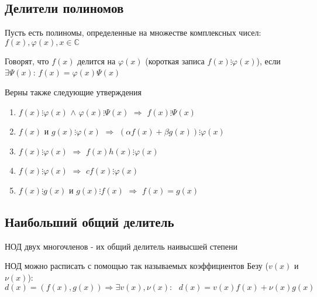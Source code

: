 \documentclass[class=article,a4paper,12pt,crop=false]{standalone}
\begin{document}
\subsection{Делители полиномов}

Пусть есть полиномы, определенные на множестве комплексных чисел: $f(x), \varphi(x), x \in \mathbb{C}$ 

Говорят, что $f(x)$ делится на $\varphi(x)$ (короткая записа $f(x) \vdots \varphi(x)$),
если $\exists \varPsi(x)$: $f(x) = \varphi(x)\varPsi(x)$

Верны также следующие утверждения
\begin{multicols}{2}
    \begin{enumerate}
        \item {
            $f(x) \vdots \varphi(x)$ $\land$ $\varphi(x)\vdots\varPsi(x)$ $\Rightarrow$ $f(x)\vdots\varPsi(x)$
        }
        \item {
            $f(x)$ и $g(x)\vdots\varphi(x)$ $\Rightarrow$ $(\alpha{f(x)} + \beta{g(x)})\vdots\varphi(x)$
        }
        \item {
            $f(x)\vdots\varphi(x)$ $\Rightarrow$ $f(x)h(x)\vdots\varphi(x)$
        }
        \columnbreak
        \item {
            $f(x)\vdots\varphi(x)$ $\Rightarrow$ $cf(x)\vdots\varphi(x)$
        }
        \item {
            $f(x)\vdots{g(x)}$ и $g(x)\vdots{f(x)}$ $\Rightarrow$ $f(x) = g(x)$
        }
        
    \end{enumerate}
\end{multicols}

\subsection{Наибольший общий делитель}

НОД двух многочленов - их общий делитель наивысшей степени

НОД можно расписать с помощью так называемых коэффициентов Безу ($v(x)$ и $\nu(x)$):
\begin{equation}
    d(x) = (f(x), g(x)) \Rightarrow \exists v(x), \nu(x): \:\:\:
    d(x) = v(x)f(x) + \nu(x)g(x)
\end{equation}
\end{document}
